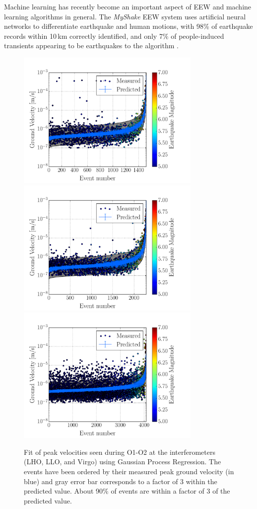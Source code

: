 \documentclass[preprint, aps, showpacs]{revtex4-1}
\begin{document}
Machine learning has recently become an important aspect of EEW and machine learning algorithms in general.
The \emph{MyShake} EEW system uses artificial neural networks to differentiate earthquake and human motions, with 98\% of earthquake records within 10\,km correctly identified, and only 7\% of people-induced transients appearing to be earthquakes to the algorithm  \cite{KoAl2016}.

\begin{figure}[t]
\hspace*{-0.5cm}
 \includegraphics[width=3.5in,trim = 2.5cm 1.5cm 2.5cm 1.5cm, clip=true]{prediction_H1O1O2_GPR.pdf}
 \includegraphics[width=3.5in,trim = 2.5cm 1.5cm 2.5cm 1.5cm, clip=true]{prediction_L1O1O2_GPR.pdf}
 \includegraphics[width=3.5in,trim = 2.5cm 1.5cm 2.5cm 1.5cm, clip=true]{prediction_V1O1O2_GPR.pdf}
 \caption{Fit of peak velocities seen during O1-O2 at the interferometers (LHO, LLO, and Virgo) using Gaussian Process Regression. The events have been ordered by their measured peak ground velocity (in blue) and gray error bar corresponds to a factor of 3 within the predicted value. About 90\% of events are within a factor of 3 of the predicted value.}
 \label{fig:regression}
\end{figure}
\end{document}
